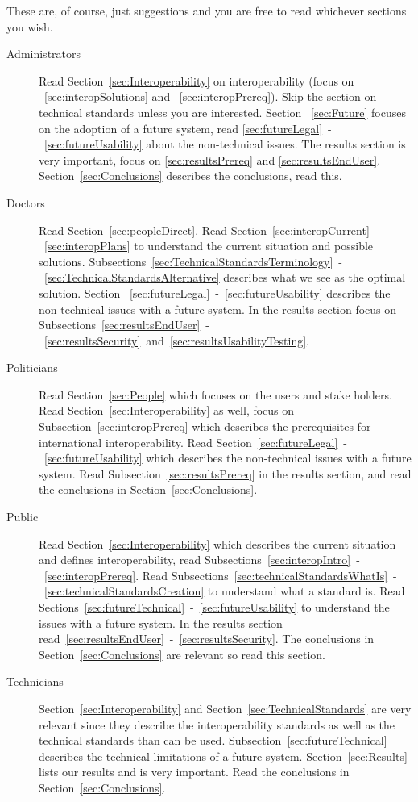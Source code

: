 \documentclass[14pt]{article}
\begin{document}
These are, of course, just suggestions and you are free to read whichever sections you wish.

\begin{description}
\item[Administrators] Read Section~\ref{sec:Interoperability} on interoperability (focus on ~\ref{sec:interopSolutions} and ~\ref{sec:interopPrereq}). Skip the section on technical standards unless you are interested. Section ~\ref{sec:Future} focuses on the adoption of a future system, read \ref{sec:futureLegal}~-~\ref{sec:futureUsability} about the non-technical issues. The results section is very important, focus on \ref{sec:resultsPrereq} and \ref{sec:resultsEndUser}. Section~\ref{sec:Conclusions} describes the conclusions, read this.
\item[Doctors] Read Section~\ref{sec:peopleDirect}. Read Section~\ref{sec:interopCurrent}~-~\ref{sec:interopPlans} to understand the current situation and possible solutions. Subsections~\ref{sec:TechnicalStandardsTerminology}~-~\ref{sec:TechnicalStandardsAlternative} describes what we see as the optimal solution. Section ~\ref{sec:futureLegal}~-~\ref{sec:futureUsability} describes the non-technical issues with a future system. In the results section focus on Subsections~\ref{sec:resultsEndUser}~-~\ref{sec:resultsSecurity}~and~\ref{sec:resultsUsabilityTesting}.
\item[Politicians] Read Section~\ref{sec:People} which focuses on the users and stake holders. Read Section~\ref{sec:Interoperability} as well, focus on Subsection~\ref{sec:interopPrereq} which describes the prerequisites for international interoperability. Read Section~\ref{sec:futureLegal}~-~\ref{sec:futureUsability} which describes the non-technical issues with a future system. Read Subsection~\ref{sec:resultsPrereq} in the results section, and read the conclusions in Section~\ref{sec:Conclusions}.
\item[Public] Read Section~\ref{sec:Interoperability} which describes the current situation and defines interoperability, read Subsections~\ref{sec:interopIntro}~-~\ref{sec:interopPrereq}. Read Subsections~\ref{sec:technicalStandardsWhatIs}~-~\ref{sec:technicalStandardsCreation} to understand what a standard is. Read Sections~\ref{sec:futureTechnical}~-~\ref{sec:futureUsability} to understand the issues with a future system. In the results section read~\ref{sec:resultsEndUser}~-~\ref{sec:resultsSecurity}. The conclusions in Section~\ref{sec:Conclusions} are relevant so read this section.
\item[Technicians] Section~\ref{sec:Interoperability} and Section~\ref{sec:TechnicalStandards} are very relevant since they describe the interoperability standards as well as the technical standards than can be used. Subsection~\ref{sec:futureTechnical} describes the technical limitations of a future system. Section~\ref{sec:Results} lists our results and is very important. Read the conclusions in Section~\ref{sec:Conclusions}.

\end{description}
\end{document}
